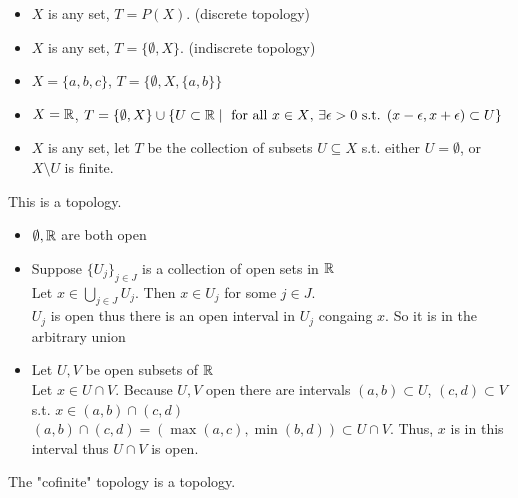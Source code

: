 \begin{example*}
    \phantom{text}
    \begin{itemize}
        \item $X$ is any set, $T=P(X)$. (discrete topology)
        \item $X$ is any set, $T=\{\emptyset, X\}$. (indiscrete topology)
        \item $X=\{a,b,c\}$, $T=\{\emptyset,X,\{a,b\}\}$
        \item $X=\mathbb{R}$, $T=\{\emptyset,X\} \cup \{U \subset \mathbb{R} \mid \text{ for all } x \in X\text{, } \exists \epsilon > 0 \text{ s.t. } (x-\epsilon,x+\epsilon) \subset U\}$
        \item $X$ is any set, let $T$ be the collection of subsets $U \subseteq X$ s.t. either $U=\emptyset$, or $X \setminus U$ is finite.
    \end{itemize}
\end{example*}
\begin{proposition}{}{}
    This is a topology.
\end{proposition}
\begin{proppf}
    \begin{itemize}
        \item $\emptyset, \mathbb{R}$ are both open
        \item Suppose $\{U_j\}_{j \in J}$ is a collection of open sets in $\mathbb{R}$\\
        Let $x \in \bigcup_{j \in J}U_j$. Then $x \in U_j$ for some $j \in J$.\\
        $U_j$ is open thus there is an open interval in $U_j$ congaing $x$. So it is in the arbitrary union
        \item Let $U,V$ be open subsets of $\mathbb{R}$\\
        Let $x \in U \cap V$. Because $U,V$ open there are intervals $(a,b) \subset U$, $(c,d) \subset V$ s.t. $x \in (a,b) \cap (c,d)$\\
        $(a,b) \cap (c,d)=(\max(a,c),\min(b,d)) \subset U \cap V$. Thus, $x$ is in this interval thus $U \cap V$ is open.
    \end{itemize}
\end{proppf}
\begin{proposition}{}{}
    The "cofinite" topology is a topology.
\end{proposition}

